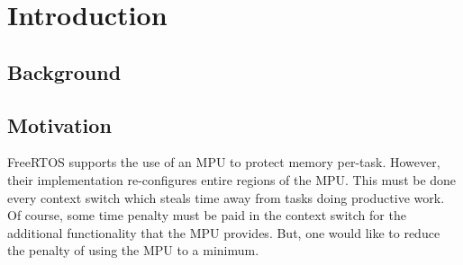 
\chapter{Introduction}

\section{Background}

\section{Motivation}

FreeRTOS supports the use of an MPU to protect memory per-task. However, their implementation re-configures entire regions of the MPU. This must be done every context switch which steals time away from tasks doing productive work. Of course, some time penalty must be paid in the context switch for the additional functionality that the MPU provides. But, one would like to reduce the penalty of using the MPU to a minimum.
